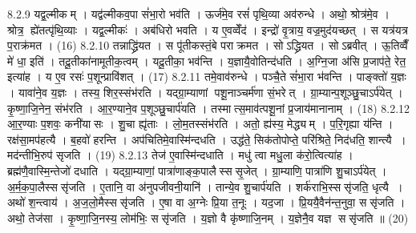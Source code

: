 8.2.9
यद्व॒ल्मीकम् । यद्व॑ल्मीकव॒पा सं॑भा॒रो भव॑ति । ऊर्ज॑मे॒व रसं॑ पृथि॒व्या अव॑रुन्धे । अथो॒ श्रोत्र॑मे॒व । श्रोत्र॒ ह्ये॑तत्पृ॑थि॒व्याः । यद्व॒ल्मीकः॑ । अब॑धिरो भवति । य ए॒वव्वेँद॑ । इन्द्रो॑ वृ॒त्राय॒ वज्र॒मुद॑यच्छत् । स यत्र॑यत्र प॒राक्र॑मत । (16)
8.2.10
तन्नाद्ध्रि॑यत । स पू॑तीकस्तं॒बे पराक्रमत । सोऽद्ध्रियत । सोऽब्रवीत् । ऊ॒तिव्वैँ मे॑ धा॒ इति॑ । तदू॒तीका॑नामूतीक॒त्वम् । यदू॒तीका॒ भव॑न्ति । य॒ज्ञायै॒वोतिन्द॑धति । अ॒ग्नि॒जा अ॑सि प्र॒जाप॑ते॒ रेत॒ इत्या॑ह । य ए॒व रसः॑ प॒शून्प्रावि॑शत् । (17)
8.2.11
तमे॒वाव॑रुन्धे । पञ्चै॒ते सं॑भा॒रा भ॑वन्ति । पाङ्क्तो॑ य॒ज्ञः । यावा॑ने॒व य॒ज्ञः । तस्य॒ शिर॒स्संभ॑रति । यद्ग्रा॒म्याणां पशू॒नाञ्चर्म॑णा सं॒भरेत् । ग्रा॒म्यान्प॒शूञ्छु॒चाऽर्प॑येत् । कृ॒ष्णा॒जि॒नेन॒ संभ॑रति । आ॒र॒ण्याने॒व प॒शूञ्छु॒चार्प॑यति । तस्मात्स॒माव॑त्पशू॒नां प्र॒जाय॑मानानाम् । (18)
8.2.12
आ॒र॒ण्याः प॒शवः॒ कनी॑यासः । शु॒चा ह्यृ॑ताः । लो॒म॒तस्संभ॑रति । अतो॒ ह्य॑स्य॒ मेद्ध्यम् । प॒रि॒गृह्या य॑न्ति । रक्ष॑सा॒मप॑हत्यै । ब॒हवो॑ हरन्ति । अप॑चितिमे॒वास्मि॑न्दधति । उद्ध॑ते॒ सिक॑तोपोप्ते॒ परि॑श्रिते॒ निद॑धति॒ शान्त्यै । मद॑न्तीभि॒रुप॑ सृजति । (19)
8.2.13
तेज॑ ए॒वास्मि॑न्दधाति । मधु॑ त्वा मधु॒ला क॑रो॒त्वित्या॑ह । ब्रह्म॑णै॒वास्मि॒न्तेजो॑ दधाति । यद्ग्रा॒म्याणां॒ पात्रा॑णाङ्क॒पालैस्ससृ॒जेत् । ग्रा॒म्याणि॒ पात्रा॑णि शु॒चाऽर्प॑येत् । अ॒र्म॒क॒पा॒लैस्ससृ॑जति । ए॒तानि॒ वा अ॑नुपजीवनी॒यानि॑ । तान्ये॒व शु॒चार्प॑यति । शर्क॑राभि॒स्ससृ॑जति॒ धृत्यै । अथो॑ श॒न्त्वाय॑ । अ॒ज॒लो॒मैस्ससृ॑जति । ए॒षा वा अ॒ग्नेः प्रि॒या त॒नूः । यद॒जा । प्रि॒ययै॒वैन॑न्त॒नुवा॒ ससृ॑जति । अथो॒ तेज॑सा । कृ॒ष्णा॒जि॒नस्य॒ लोम॑भिः॒ ससृ॑जति । य॒ज्ञो वै कृ॑ष्णाजि॒नम् । य॒ज्ञेनै॒व यज्ञ ससृ॑जति ॥ (20)
\anuvakamend

